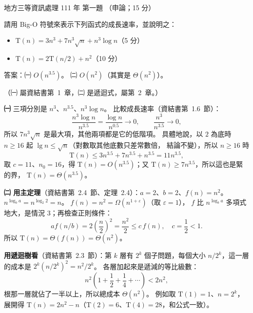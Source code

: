 \begin{pastexam}[label={px:df3-111-ds-01}]{地方三等資訊處理 111 年 第一題}
（申論；15 分）

請用 Big-O 符號來表示下列函式的成長速率，並說明之：
\begin{itemize}[leftmargin=2.2em, nosep]
\item[㈠] $\mathrm{T}(n) = 3n^{3} + 7n^{3}\sqrt{n} + n^{3}\log n$（5 分）
\item[㈡] $\mathrm{T}(n) = 2\mathrm{T}(n/2) + n^{2}$（10 分）
\end{itemize}
\end{pastexam}

\begin{pastsoln}
答案：㈠ $O(n^{3.5})$。 ㈡ $O(n^{2})$（其實是 $\Theta(n^{2})$）。

（㈠ 屬資結書第~1~章，㈡ 是遞迴式，屬第~2~章。）

\textbf{㈠} 三項分別是 $n^{3}$、$n^{3.5}$、$n^{3}\log n$。 比較成長速率（資結書第~1.6~節）：
\[
\frac{n^{3}\log n}{n^{3.5}} = \frac{\log n}{n^{0.5}} \to 0,\qquad \frac{n^{3}}{n^{3.5}} \to 0,
\]
所以 $7n^{3}\sqrt{n}$ 是最大項，其他兩項都是它的低階項。 具體地說，以 $2$ 為底時 $n \ge 16$ 起 $\lg n \le \sqrt{n}$（對數取其他底數只差常數倍，
結論不變），所以 $n \ge 16$ 時
\[
\mathrm{T}(n) \le 3n^{3.5} + 7n^{3.5} + n^{3.5} = 11 n^{3.5},
\]
取 $c = 11$、$n_0 = 16$，得 $\mathrm{T}(n) = O(n^{3.5})$；又 $\mathrm{T}(n) \ge 7n^{3.5}$，所以這也是緊的界，
$\mathrm{T}(n) = \Theta(n^{3.5})$。

\textbf{㈡ 用主定理}（資結書第~2.4~節、定理~2.4）：$a = 2$、$b = 2$、$f(n) = n^{2}$。
$n^{\log_b a} = n^{\log_2 2} = n$。 $f(n) = n^{2} = \Omega(n^{1 + \varepsilon})$（取 $\varepsilon = 1$），
$f$ 比 $n^{\log_b a}$ 多項式地大，是情況 3；再檢查正則條件：
\[
a f(n/b) = 2 \left(\frac{n}{2}\right)^{2} = \frac{n^{2}}{2} \le c\, f(n),\quad c = \frac12 < 1.
\]
所以 $\mathrm{T}(n) = \Theta(f(n)) = \Theta(n^{2})$。

\textbf{用遞迴樹看}（資結書第~2.3~節）：第 $k$ 層有 $2^{k}$ 個子問題，每個大小 $n/2^{k}$，這一層的成本是
$2^{k}(n/2^{k})^{2} = n^{2}/2^{k}$。 各層加起來是遞減的等比級數：
\[
n^{2}\left(1 + \frac12 + \frac14 + \cdots\right) < 2n^{2},
\]
根那一層就佔了一半以上，所以總成本 $\Theta(n^{2})$。 例如取 $\mathrm{T}(1) = 1$、$n = 2^{k}$，展開得
$\mathrm{T}(n) = 2n^{2} - n$（$\mathrm{T}(2) = 6$、$\mathrm{T}(4) = 28$，和公式一致）。
\end{pastsoln}
